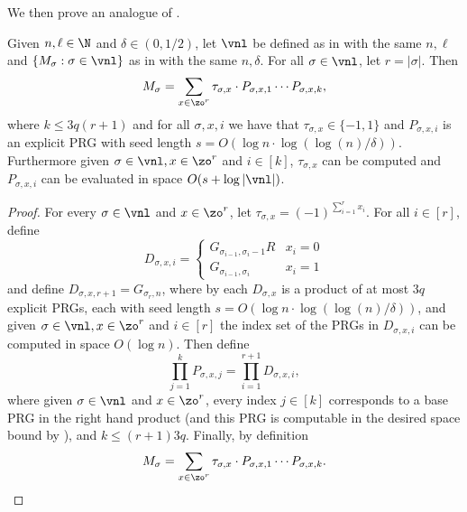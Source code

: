 We then prove an analogue of .
\begin{corollary}\label{cor:MstructCycle}
Given $n,\ell \in  \N$ and $\delta \in (0,1/2)$, let $\vnl$ be defined as in  with the same $n,\ell$ and $\{M_\sigma:\sigma\in\vnl\}$ as in  with the same $n,\delta$. For all $\sigma\in \vnl$, let $r=|\sigma|$. Then
\[M_\sigma=\sum_{x\in \zo^r}\tau_{\sigma,x}\cdot P_{\sigma,x,1}\cdots P_{\sigma,x,k},\]
where $k\leq 3q(r+1)$ and for all $\sigma,x,i$ we have that $\tau_{\sigma,x}\in \{-1,1\}$ and $P_{\sigma,x,i}$ is an explicit PRG with seed length $s=O(\log n\cdot\log(\log(n)/\delta))$.
Furthermore given $\sigma\in \vnl,x\in \zo^r$ and $i\in [k]$, $\tau_{\sigma,x}$ can be computed and $P_{\sigma,x,i}$ can be evaluated in space $O(s+\log|\vnl|)$.
\end{corollary}
\begin{proof}
For every $\sigma\in \vnl$ and $x\in \zo^{r}$, let $\tau_{\sigma,x}=(-1)^{\sum_{i=1}^{r}x_i}$. 
For all $i\in[r]$, define %
\[D_{\sigma,x,i} = \begin{cases}
G_{\sigma_{i-1},\sigma_i-1}R & x_i=0\\
G_{\sigma_{i-1},\sigma_i} & x_i=1
\end{cases}\]
and define $D_{\sigma,x,r+1}=G_{\sigma_{r},n}$, where by  each $D_{\sigma,x}$ is a product of at most $3q$ explicit PRGs, each with seed length $s=O(\log n\cdot\log(\log(n)/\delta))$, and given $\sigma\in \vnl,x\in \zo^r$ and $i\in[r]$ the index set of the PRGs in $D_{\sigma,x,i}$ can be computed in space $O(\log n)$. Then define %
$$\prod_{j=1}^kP_{\sigma,x,j}=\prod_{i=1}^{r+1}D_{\sigma,x,i},$$ 
where given $\sigma\in \vnl$ and $x\in \zo^r$, every index $j\in[k]$ corresponds to a base PRG in the right hand product (and this PRG is computable in the desired space bound by ), and $k\leq (r+1)3q$. Finally, by definition
\[M_\sigma=\sum_{x\in \zo^r}\tau_{\sigma,x}\cdot P_{\sigma,x,1}\cdots P_{\sigma,x,k}.\qedhere\]
\end{proof}

